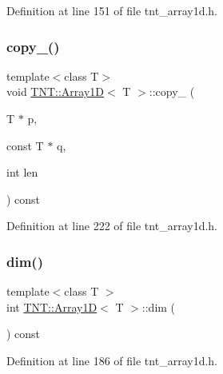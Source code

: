 Definition at line 151 of file tnt\+\_\+array1d.\+h.

\mbox{\label{classTNT_1_1Array1D_a0467b4a5f2d6ab778913bf1b70523700}} 
\subsubsection{\texorpdfstring{copy\+\_\+()}{copy\_()}}
{\footnotesize\ttfamily template$<$class T$>$ \\
void \hyperlink{classTNT_1_1Array1D}{T\+N\+T\+::\+Array1D}$<$ T $>$\+::copy\+\_\+ (\begin{DoxyParamCaption}\item[{T $\ast$}]{p,  }\item[{const T $\ast$}]{q,  }\item[{int}]{len }\end{DoxyParamCaption}) const\hspace{0.3cm}{\ttfamily [private]}}



Definition at line 222 of file tnt\+\_\+array1d.\+h.

\mbox{\label{classTNT_1_1Array1D_a1d2fb4661112c951c792e91bf0d357a0}} 
\subsubsection{\texorpdfstring{dim()}{dim()}}
{\footnotesize\ttfamily template$<$class T $>$ \\
int \hyperlink{classTNT_1_1Array1D}{T\+N\+T\+::\+Array1D}$<$ T $>$\+::dim (\begin{DoxyParamCaption}{ }\end{DoxyParamCaption}) const\hspace{0.3cm}{\ttfamily [inline]}}



Definition at line 186 of file tnt\+\_\+array1d.\+h.

\mbox{\label{classTNT_1_1Array1D_a0520ceb2c7ec7739034d441cbef00253}} 
